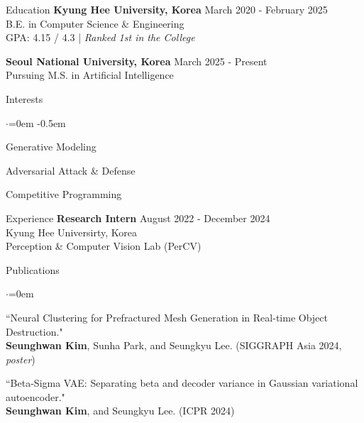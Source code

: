 \documentclass{resume}
\begin{document}
\begin{rSection}{Education}
  {\bf Kyung Hee University, Korea } \hfill {March 2020 - February 2025} \\
  { B.E. in Computer Science \& Engineering} \\
  { GPA: 4.15 / 4.3 | \it Ranked 1st in the College}

  {\bf Seoul National University, Korea } \hfill {March 2025 - Present} \\
  { Pursuing M.S. in Artificial Intelligence }
\end{rSection}

\begin{rSection}{Interests}
  \begin{list}{$\cdot$}{\leftmargin=0em}
    \itemsep -0.5em
    \item Generative Modeling
    \item Adversarial Attack \& Defense
    \item Competitive Programming
  \end{list}
\end{rSection}

\begin{rSection}{Experience}
  {\bf Research Intern } \hfill {August 2022 - December 2024} \\
  { Kyung Hee Universirty, Korea } \\
  { Perception \& Computer Vision Lab (PerCV) }
\end{rSection}

\begin{rSection}{Publications}
  \begin{list}{$\cdot$}{\leftmargin=0em}
    \item ``Neural Clustering for Prefractured Mesh Generation in Real-time Object Destruction." \\ {\bf Seunghwan Kim}, Sunha Park, and Seungkyu Lee. (SIGGRAPH Asia 2024, {\it poster})
    \item ``Beta-Sigma VAE: Separating beta and decoder variance in Gaussian variational autoencoder." \\ {\bf Seunghwan Kim}, and Seungkyu Lee. (ICPR 2024)
  \end{list}
\end{rSection}
\end{document}
